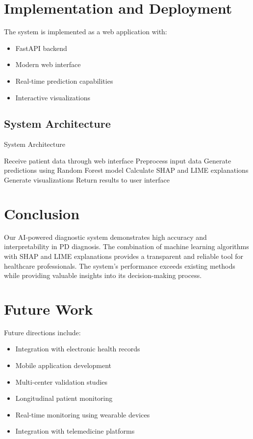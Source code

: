 \documentclass[conference]{IEEEtran}
\begin{document}
\section{Implementation and Deployment}
The system is implemented as a web application with:
\begin{itemize}
    \item FastAPI backend
    \item Modern web interface
    \item Real-time prediction capabilities
    \item Interactive visualizations
\end{itemize}

\subsection{System Architecture}
\begin{algorithm}[H]
\caption{System Architecture}
\begin{algorithmic}[1]
\State Receive patient data through web interface
\State Preprocess input data
\State Generate predictions using Random Forest model
\State Calculate SHAP and LIME explanations
\State Generate visualizations
\State Return results to user interface
\end{algorithmic}
\end{algorithm}

\section{Conclusion}
Our AI-powered diagnostic system demonstrates high accuracy and interpretability in PD diagnosis. The combination of machine learning algorithms with SHAP and LIME explanations provides a transparent and reliable tool for healthcare professionals. The system's performance exceeds existing methods while providing valuable insights into its decision-making process.

\section{Future Work}
Future directions include:
\begin{itemize}
    \item Integration with electronic health records
    \item Mobile application development
    \item Multi-center validation studies
    \item Longitudinal patient monitoring
    \item Real-time monitoring using wearable devices
    \item Integration with telemedicine platforms
\end{itemize}
\end{document}

